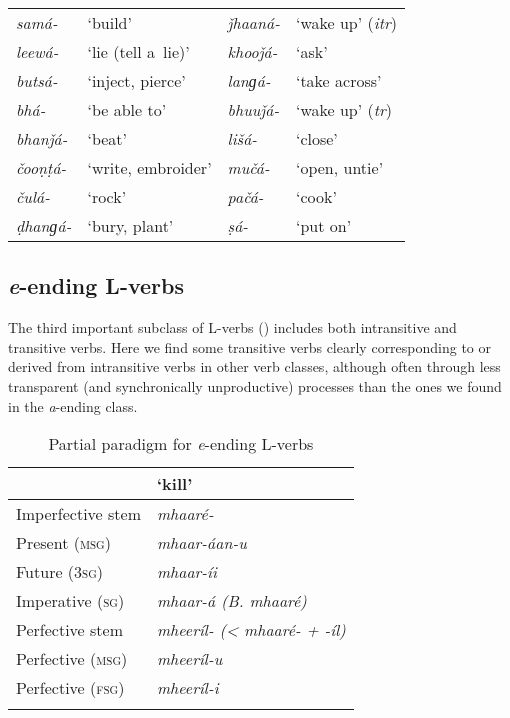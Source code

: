 \begin{table}[H]
\begin{tabularx}{\textwidth}{ l@{\hspace{20pt}} Q l@{\hspace{20pt}} Q }
\textit{samá-} &
`build' &
\textit{ǰhaaná-} &
`wake up' (\textit{itr})\\
\textit{leewá-} &
`lie (tell a~lie)' &
\textit{khooǰá-} &
`ask'\\
\textit{butsá-} &
`inject, pierce' &
\textit{lanɡá-} &
`take across'\\
\textit{bhá-} &
`be able to' &
\textit{bhuuǰá-} &
`wake up' (\textit{tr})\\
\textit{bhanǰá-} &
`beat' &
\textit{lišá-} &
`close'\\
\textit{čooṇṭá-} &
`write, embroider' &
\textit{mučá-} &
`open, untie'\\
\textit{čulá-} &
`rock' &
\textit{pačá-} &
`cook'\\
\textit{ḍhanɡá-} &
`bury, plant' &
\textit{ṣá-} &
`put on'\\
\end{tabularx}
\end{table}

\subsection{\textit{e}-ending L-verbs}
\label{subsec:8-3-3}


The third important subclass of L-verbs () includes both intransitive and transitive verbs. Here we find some transitive verbs clearly corresponding to or derived from intransitive verbs in other verb classes, although often through less transparent (and synchronically unproductive) processes than the ones we found in the \textit{a}-ending class.


\begin{table}[ht]
\caption{Partial paradigm for \textit{e}-ending L-verbs}
\begin{tabularx}{.75\textwidth}{ Q Q }
\lsptoprule
&
`kill'\\\hline
Imperfective stem &
\textit{mhaaré-}\\
Present (\textsc{msg}) &
\textit{mhaar-áan-u} \\
Future (\textsc{3sg}) &
\textit{mhaar-íi} \\
Imperative (\textsc{sg}) &
\textit{mhaar-á (B. mhaaré)}\\
Perfective stem &
\textit{mheeríl- ({\textless} mhaaré- + -íl)}\\
Perfective (\textsc{msg}) &
\textit{mheeríl-u} \\
Perfective (\textsc{fsg}) &
\textit{mheeríl-i} \\\lspbottomrule
\end{tabularx}
\label{tab:8-6}
\end{table}


